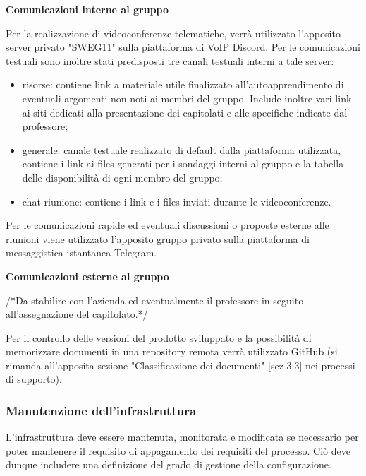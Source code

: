 \textbf{Comunicazioni interne al gruppo}

 Per la realizzazione di videoconferenze telematiche, verrà utilizzato l'apposito server privato "SWEG11" sulla piattaforma di VoIP Discord.
Per le comunicazioni testuali sono inoltre stati predisposti tre canali testuali interni a tale server:

\begin{itemize}
    \item risorse: contiene link a materiale utile finalizzato all'autoapprendimento di eventuali argomenti non noti ai membri del gruppo. Include inoltre vari link ai siti dedicati alla presentazione dei capitolati e  alle specifiche indicate dal professore;
    \item generale: canale testuale realizzato di default dalla piattaforma utilizzata, contiene i link ai files generati per i sondaggi interni al gruppo e la tabella delle disponibilità di ogni membro del gruppo;
    \item chat-riunione: contiene i link e i files inviati durante le videoconferenze.
\end{itemize}

Per le comunicazioni rapide ed eventuali discussioni o proposte esterne alle riunioni viene utilizzato l'apposito gruppo privato sulla piattaforma di messaggistica istantanea Telegram.

\textbf{Comunicazioni esterne al gruppo}

/*Da stabilire con l'azienda ed eventualmente il professore in seguito all'assegnazione del capitolato.*/


Per il controllo delle versioni del prodotto sviluppato e la possibilità di memorizzare documenti in una repository remota verrà utilizzato GitHub (si rimanda all'apposita sezione "Classificazione dei documenti" [sez 3.3] nei processi di supporto).

\subsubsection{Manutenzione dell'infrastruttura}
L'infrastruttura deve essere mantenuta, monitorata e modificata se necessario per poter mantenere il requisito di appagamento dei requisiti del processo. Ciò deve dunque includere una definizione del grado di gestione della configurazione.
